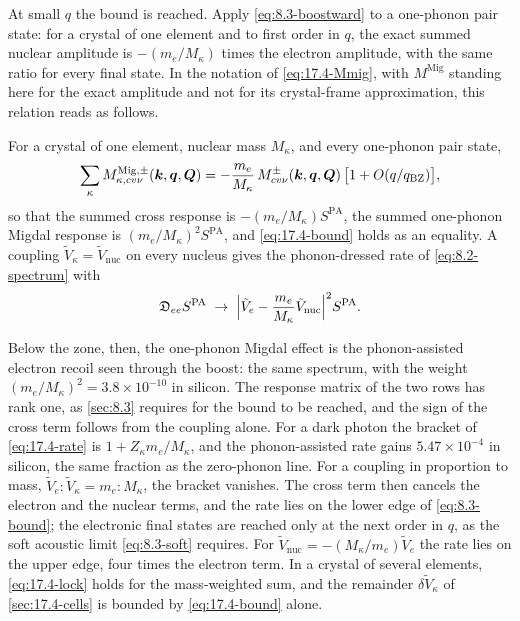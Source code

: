 At small $q$ the bound is reached. Apply \cref{eq:8.3-boostward} to a one-phonon pair state: for a crystal of one element and to first order in $q$, the exact summed nuclear amplitude is $-(m_e/M_\kappa)$ times the electron amplitude, with the same ratio for every final state. In the notation of \cref{eq:17.4-Mmig}, with $M^{\mathrm{Mig}}$ standing here for the exact amplitude and not for its crystal-frame approximation, this relation reads as follows.
\begin{keyresult}
For a crystal of one element, nuclear mass $M_\kappa$, and every one-phonon pair state,
\begin{equation}
  \sum_\kappa M^{\mathrm{Mig},\pm}_{\kappa,cv\nu}(\bm{k},\bm{q},\bm{Q}) = -\frac{m_e}{M_\kappa}\,M^{\pm}_{cv\nu}(\bm{k},\bm{q},\bm{Q})\,\bigl[1 + O(q/q_{\mathrm{BZ}})\bigr] ,
  \label{eq:17.4-lock}
\end{equation}
so that the summed cross response is $-(m_e/M_\kappa)S^{\mathrm{PA}}$, the summed one-phonon Migdal response is $(m_e/M_\kappa)^2S^{\mathrm{PA}}$, and \cref{eq:17.4-bound} holds as an equality. A coupling $\tilde V_\kappa = \tilde V_{\mathrm{nuc}}$ on every nucleus gives the phonon-dressed rate of \cref{eq:8.2-spectrum} with
\begin{equation}
  \mathfrak{D}_{ee}S^{\mathrm{PA}} \;\to\; \Bigl|\tilde V_e - \frac{m_e}{M_\kappa}\tilde V_{\mathrm{nuc}}\Bigr|^2S^{\mathrm{PA}} .
  \label{eq:17.4-rate}
\end{equation}
\end{keyresult}
\noindent Below the zone, then, the one-phonon Migdal effect is the phonon-assisted electron recoil seen through the boost: the same spectrum, with the weight $(m_e/M_\kappa)^2 = 3.8\times10^{-10}$ in silicon. The response matrix of the two rows has rank one, as \cref{sec:8.3} requires for the bound to be reached, and the sign of the cross term follows from the coupling alone. For a dark photon the bracket of \cref{eq:17.4-rate} is $1 + Z_\kappa m_e/M_\kappa$, and the phonon-assisted rate gains $5.47\times10^{-4}$ in silicon, the same fraction as the zero-phonon line. For a coupling in proportion to mass, $\tilde V_e : \tilde V_\kappa = m_e : M_\kappa$, the bracket vanishes. The cross term then cancels the electron and the nuclear terms, and the rate lies on the lower edge of \cref{eq:8.3-bound}; the electronic final states are reached only at the next order in $q$, as the soft acoustic limit \cref{eq:8.3-soft} requires. For $\tilde V_{\mathrm{nuc}} = -(M_\kappa/m_e)\tilde V_e$ the rate lies on the upper edge, four times the electron term. In a crystal of several elements, \cref{eq:17.4-lock} holds for the mass-weighted sum, and the remainder $\delta\tilde V_\kappa$ of \cref{sec:17.4-cells} is bounded by \cref{eq:17.4-bound} alone.

